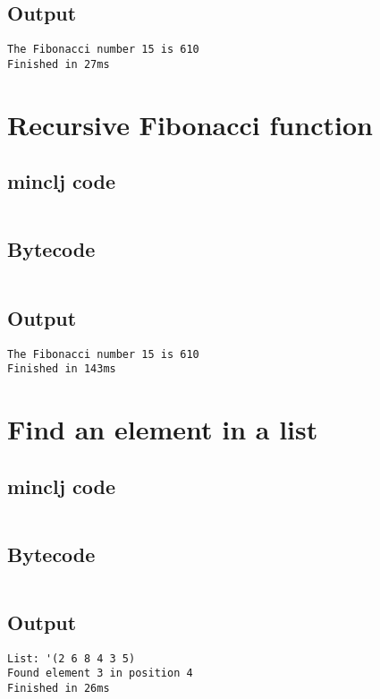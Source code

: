 \documentclass[11pt]{scrreprt}
\begin{document}
\subsection{Output}
\begin{verbatim}
The Fibonacci number 15 is 610
Finished in 27ms
\end{verbatim}


\section{Recursive Fibonacci function}
\subsection{minclj code}
\inputminted{clojure}{/home/mario/git/MarioJim/miniclj/examples/recursive_fibonacci.clj}

\subsection{Bytecode}
\inputminted{text}{/home/mario/git/MarioJim/miniclj/examples/recursive_fibonacci.mclj}

\subsection{Output}
\begin{verbatim}
The Fibonacci number 15 is 610
Finished in 143ms
\end{verbatim}


\section{Find an element in a list}
\subsection{minclj code}
\inputminted{clojure}{/home/mario/git/MarioJim/miniclj/examples/find_in_list.clj}

\subsection{Bytecode}
\inputminted{text}{/home/mario/git/MarioJim/miniclj/examples/find_in_list.mclj}

\subsection{Output}
\begin{verbatim}
List: '(2 6 8 4 3 5)
Found element 3 in position 4
Finished in 26ms
\end{verbatim}
\end{document}
